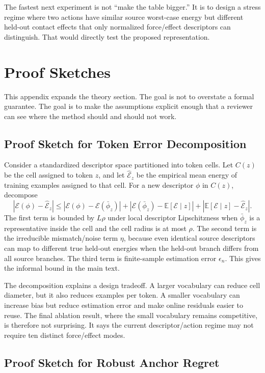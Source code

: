 \documentclass{article}
\newcommand{\energy}{\mathcal{E}}
\newcommand{\features}{\phi}
\begin{document}
The fastest next experiment is not ``make the table bigger.'' It is to design a stress regime where two actions have similar source worst-case energy but different held-out contact effects that only normalized force/effect descriptors can distinguish. That would directly test the proposed representation.

\section{Proof Sketches}

This appendix expands the theory section. The goal is not to overstate a formal guarantee. The goal is to make the assumptions explicit enough that a reviewer can see where the method should and should not work.

\subsection{Proof Sketch for Token Error Decomposition}

Consider a standardized descriptor space partitioned into token cells. Let $C(z)$ be the cell assigned to token $z$, and let $\hat{\energy}_z$ be the empirical mean energy of training examples assigned to that cell. For a new descriptor $\features$ in $C(z)$, decompose
\[
|\energy(\features)-\hat{\energy}_z|
\leq
|\energy(\features)-\energy(\bar{\features}_z)|
+
|\energy(\bar{\features}_z)-\mathbb{E}[\energy\mid z]|
+
|\mathbb{E}[\energy\mid z]-\hat{\energy}_z|.
\]
The first term is bounded by $L\rho$ under local descriptor Lipschitzness when $\bar{\features}_z$ is a representative inside the cell and the cell radius is at most $\rho$. The second term is the irreducible mismatch/noise term $\eta$, because even identical source descriptors can map to different true held-out energies when the held-out branch differs from all source branches. The third term is finite-sample estimation error $\epsilon_n$. This gives the informal bound in the main text.

The decomposition explains a design tradeoff. A larger vocabulary can reduce cell diameter, but it also reduces examples per token. A smaller vocabulary can increase bias but reduce estimation error and make online residuals easier to reuse. The final ablation result, where the small vocabulary remains competitive, is therefore not surprising. It says the current descriptor/action regime may not require ten distinct force/effect modes.

\subsection{Proof Sketch for Robust Anchor Regret}
\end{document}
